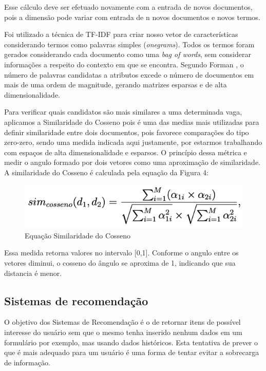 \documentclass[conference]{IEEEtran}
\begin{document}
    Esse cálculo deve ser efetuado novamente com a entrada de novos documentos, pois a dimensão pode variar com entrada de n novos documentos e novos termos.

    Foi utilizado a técnica de TF-IDF para criar nosso vetor de características considerando termos como palavras simples (\textit{onegrams}). Todos os termos foram gerados considerando cada documento como uma \textit{bag of words}, sem considerar informações a respeito do contexto em que se encontra. Segundo Forman \cite{bagofwords}, o número de palavras candidatas a atributos excede o número de documentos em mais de uma ordem de magnitude, gerando matrizes esparsas e de alta dimensionalidade.
     
    Para verificar quais candidatos são mais similares a uma determinada vaga, aplicamos a Similaridade do Cosseno pois é uma das medias mais utilizadas para definir similaridade entre dois documentos, pois favorece comparações do tipo zero-zero, sendo uma medida indicada aqui justamente, por estarmos trabalhando com espaços de alta dimensionalidade e esparsos. O princípio dessa métrica e medir o angulo formado por dois vetores como uma aproximação de similaridade. A similaridade do Cosseno é calculada pela equação da Figura 4:

	\begin{figure}[htbp]
	\centerline{\includegraphics[scale=.4]{imagens/cosseno.png}}
	\caption{Equação Similaridade do Cosseno}
	\label{fig}
	\end{figure}

Essa medida retorna valores no intervalo [0,1]. Conforme o angulo entre os vetores diminui, o cosseno do ângulo se aproxima de 1, indicando que sua distancia é menor.

	\subsection{Sistemas de recomendação}
    	
    O objetivo dos Sistemas de Recomendação é o de retornar itens de possível interesse do usuário sem que o mesmo tenha inserido nenhum dados em um formulário por exemplo, mas usando dados históricos. Esta tentativa de prever o que é mais adequado para um usuário é uma forma de tentar evitar a sobrecarga de informação.
    
\end{document}
